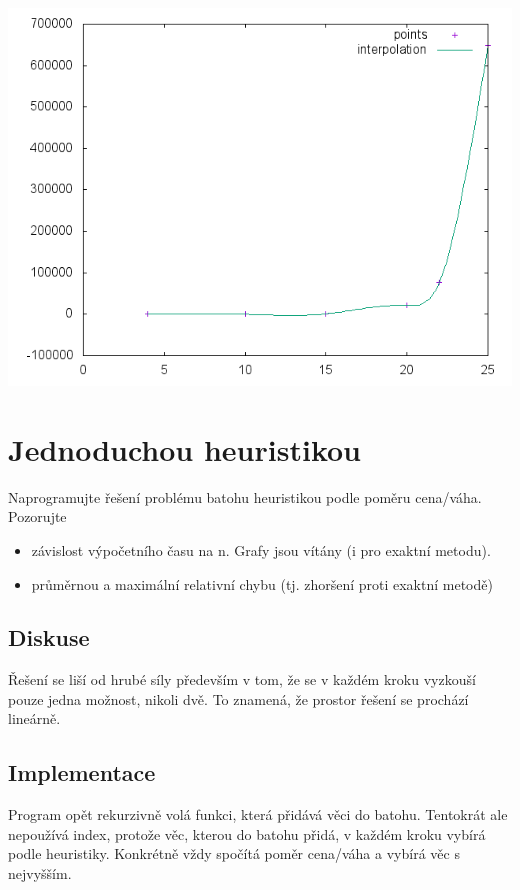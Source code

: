 \documentclass[12pt,a4paper]{article}
\begin{document}
\begin{center}
\includegraphics[width=\textwidth]{brute}
\end{center}



\section{Jednoduchou heuristikou}

Naprogramujte řešení problému batohu heuristikou podle poměru cena/váha. Pozorujte
\begin{itemize}
\item závislost výpočetního času na n. Grafy jsou vítány (i pro exaktní metodu).
\item průměrnou a maximální relativní chybu (tj. zhoršení proti exaktní metodě)
\end{itemize}

\subsection{Diskuse}

Řešení se liší od hrubé síly především v tom, že se v každém kroku vyzkouší pouze jedna možnost, nikoli dvě.
To znamená, že prostor řešení se prochází lineárně.

\subsection{Implementace}

Program opět rekurzivně volá funkci, která přidává věci do batohu.
Tentokrát ale nepoužívá index, protože věc, kterou do batohu přidá, v každém kroku vybírá podle heuristiky.
Konkrétně vždy spočítá poměr cena/váha a vybírá věc s nejvyšším.
\end{document}
